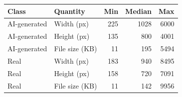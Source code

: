 \begin{tabular}{llrrr}
\toprule
\textbf{Class} & \textbf{Quantity} & \textbf{Min} & \textbf{Median} & \textbf{Max} \\
\midrule
AI-generated & Width (px) & 225 & 1028 & 6000 \\
AI-generated & Height (px) & 135 & 800 & 4001 \\
AI-generated & File size (KB) & 11 & 195 & 5494 \\
Real & Width (px) & 183 & 940 & 8495 \\
Real & Height (px) & 158 & 720 & 7091 \\
Real & File size (KB) & 11 & 142 & 9956 \\
\bottomrule
\end{tabular}
